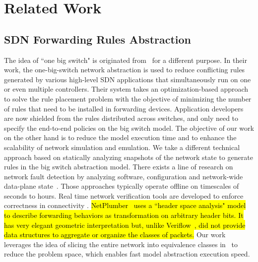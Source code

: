 \section{Related Work}
\label{OBS:Sec:RelatedWork}

\subsection{SDN Forwarding Rules Abstraction}

The idea of ``one big switch" is originated from~\mbox{\cite{OneBigSwitchAbstraction}} for a different purpose.
In their work, the one-big-switch network abstraction is used to reduce conflicting rules generated by
various high-level SDN applications that simultaneously run on one or even multiple controllers.
Their system takes an optimization-based approach to solve the rule placement problem with
the objective of minimizing the number of rules that need to be installed in forwarding devices.
Application developers are now shielded from the rules distributed across switches, and only need to specify the end-to-end policies on the big switch model. 
The objective of our work on the other hand is to reduce the model execution time and to
enhance the scalability of network simulation and emulation.
We take a different technical approach based on statically analyzing snapshots of the network state to generate rules in the big switch abstraction model.
There exists a line of research on network fault detection by analyzing software,
configuration and network-wide data-plane state~\cite{Al-Shaer2010,Al-Shaer2009,Anteater2011,xz+05}.
Those approaches typically operate offline on timescales of seconds to hours.
Real time network verification tools are developed to enforce correctness in connectivity \cite{NetPlumber2013,Veriflow}.
\hl{
NetPlumber~\mbox{\cite{NetPlumber2013}} uses a ``header space analysis" model to
describe forwarding behaviors as transformation on arbitrary header bits.
It has very elegant geometric interpretation but, unlike Veriflow~\mbox{\cite{Veriflow}}, did not
provide data structures to aggregate or organize the classes of packets.
}
\fi
Our work leverages the idea of slicing the entire network into equivalence classes in~\cite{Veriflow}
to reduce the problem space, which enables fast model abstraction execution speed.

